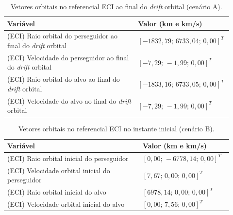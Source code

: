 \begin{table}[H]
\centering
\caption{Vetores orbitais no referencial ECI ao final do \emph{drift} orbital (cenário A).}
\label{tab:cap4_eciA_final}
\begingroup
\small
\setlength{\tabcolsep}{4pt}
\renewcommand{\arraystretch}{1.15}
\begin{tabular}{|p{0.58\linewidth}|p{0.34\linewidth}|}
\hline
Variável & Valor (km e km/s)\\
\hline
(ECI) Raio orbital do perseguidor ao final do \emph{drift} orbital &
$\left[-1832,79;\,6733,04;\,0,00\right]^T$\\
\hline
(ECI) Velocidade do perseguidor ao final do \emph{drift} orbital &
$\left[-7,29;\,-1,99;\,0,00\right]^T$\\
\hline
(ECI) Raio orbital do alvo ao final do \emph{drift} orbital &
$\left[-1833,16;\,6733,05;\,0,00\right]^T$\\
\hline
(ECI) Velocidade do alvo ao final do \emph{drift} orbital &
$\left[-7,29;\,-1,99;\,0,00\right]^T$\\
\hline
\end{tabular}
\endgroup
\end{table}


\begin{table}[H]
\centering
\caption{Vetores orbitais no referencial ECI no instante inicial (cenário B).}
\label{tab:cap4_eciB_inicial}
\begingroup
\small
\setlength{\tabcolsep}{4pt}
\renewcommand{\arraystretch}{1.15}
\begin{tabular}{|p{0.58\linewidth}|p{0.34\linewidth}|}
\hline
Variável & Valor (km e km/s)\\
\hline
(ECI) Raio orbital inicial do perseguidor &
$\left[0,00;\,-6778,14;\,0,00\right]^T$\\
\hline
(ECI) Velocidade orbital inicial do perseguidor &
$\left[7,67;\,0,00;\,0,00\right]^T$\\
\hline
(ECI) Raio orbital inicial do alvo &
$\left[6978,14;\,0,00;\,0,00\right]^T$\\
\hline
(ECI) Velocidade orbital inicial do alvo &
$\left[0,00;\,7,56;\,0,00\right]^T$\\
\hline
\end{tabular}
\endgroup
\end{table}

